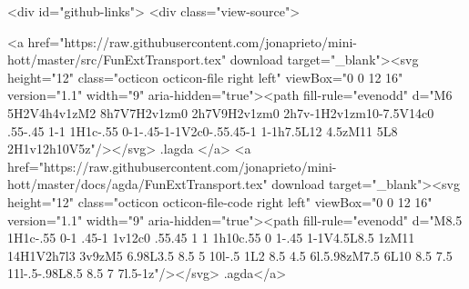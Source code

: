   <div id="github-links">
    <div class="view-source">
      
        <a href="https://raw.githubusercontent.com/jonaprieto/mini-hott/master/src/FunExtTransport.tex" download target="_blank"><svg height="12" class="octicon octicon-file right left" viewBox="0 0 12 16" version="1.1" width="9" aria-hidden="true"><path fill-rule="evenodd" d="M6 5H2V4h4v1zM2 8h7V7H2v1zm0 2h7V9H2v1zm0 2h7v-1H2v1zm10-7.5V14c0 .55-.45 1-1 1H1c-.55 0-1-.45-1-1V2c0-.55.45-1 1-1h7.5L12 4.5zM11 5L8 2H1v12h10V5z"/></svg> .lagda </a>
        <a href="https://raw.githubusercontent.com/jonaprieto/mini-hott/master/docs/agda/FunExtTransport.tex" download target="_blank"><svg height="12" class="octicon octicon-file-code right left" viewBox="0 0 12 16" version="1.1" width="9" aria-hidden="true"><path fill-rule="evenodd" d="M8.5 1H1c-.55 0-1 .45-1 1v12c0 .55.45 1 1 1h10c.55 0 1-.45 1-1V4.5L8.5 1zM11 14H1V2h7l3 3v9zM5 6.98L3.5 8.5 5 10l-.5 1L2 8.5 4.5 6l.5.98zM7.5 6L10 8.5 7.5 11l-.5-.98L8.5 8.5 7 7l.5-1z"/></svg> .agda</a>
      
